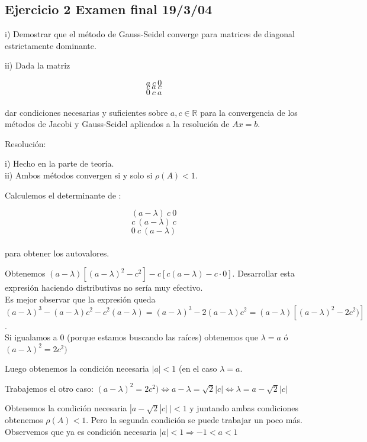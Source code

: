 \documentclass[10pt,a4paper,final]{report}
\begin{document}
{\subsection{Ejercicio 2 Examen final 19/3/04}

i) Demostrar que el método de Gauss-Seidel converge para matrices de diagonal estrictamente dominante.

ii) Dada la matriz

$$a\ c\ 0$$
$$c\ a\ c$$
$$0\ c\ a$$\\

dar condiciones necesarias y suficientes sobre $a,c\in \mathbb{R}$ para la convergencia de los métodos de Jacobi y Gauss-Seidel aplicados a la resolución de $Ax=b$.

Resolución:

i) Hecho en la parte de teoría.\\

ii) Ambos métodos convergen si y solo si $\rho(A)<1$.


\iffalse
Calculemos el determinante de  :

$$(a - \lambda)\ c\ 0$$
$$c\ (a-\lambda)\ c$$
$$0\ c\ (a-\lambda)$$\\

para obtener los autovalores.

Obtenemos $(a-\lambda) [(a-\lambda)^2 - c^2] - c [c (a-\lambda) - c \cdot 0]$. Desarrollar esta expresión haciendo distributivas no sería muy efectivo.\\

Es mejor observar que la expresión queda $(a-\lambda)^3 - (a-\lambda) c^2 - c^2 (a-\lambda) = (a-\lambda)^3 - 2(a-\lambda) c^2 = (a-\lambda) [(a-\lambda)^2 - 2c^2)]$.\\

Si igualamos a $0$ (porque estamos buscando las raíces) obtenemos que $\lambda = a$ ó $(a-\lambda)^2 = 2c^2)$

Luego obtenemos la condición necesaria $|a|<1$ (en el caso $\lambda = a$.

Trabajemos el otro caso: $(a-\lambda)^2 = 2c^2) \Leftrightarrow a - \lambda = \sqrt{2}|c| \Leftrightarrow \lambda = a - \sqrt{2} |c|$

Obtenemos la condición necesaria $|a-\sqrt{2} |c|\ | <1$ y juntando ambas condiciones obtenemos $\rho(A) < 1$. Pero la segunda condición se puede trabajar un poco más.\\

Observemos que ya es condición necesaria $|a|<1 \Rightarrow -1 < a < 1$

}
\end{document}
